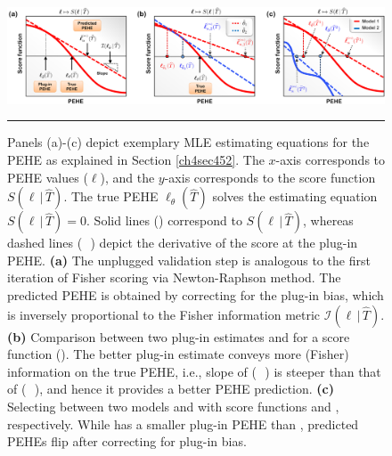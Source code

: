 \documentclass [PhD] {uclathes}
\newcommand*{\xdash}[1][1.5em]{\rule[0.25ex]{#1}{1.55pt}}
\newcommand*{\xdashed}[1][.25em]{\rule[0.25ex]{#1}{1.55pt}}
\newcommand*{\rxdashed}{{\color{red}{\xdashed}\,\color{red}{\xdashed}\,\color{red}{\xdashed}\,\color{red}{\xdashed}\,\color{red}{\xdashed}}}
\newcommand*{\rxdash}{{\color{red}{\xdash}}}
\newcommand*{\bxdashed}{{\color{blue}{\xdashed}\,\color{blue}{\xdashed}\,\color{blue}{\xdashed}\,\color{blue}{\xdashed}\,\color{blue}{\xdashed}}}
\begin{document}
\begin{figure}[t]
  \centering
  \includegraphics[width=1\linewidth]{ch4Fig3.pdf} 
  \caption{Panels (a)-(c) depict exemplary MLE estimating equations for the PEHE as explained in Section \ref{ch4sec452}. The \mbox{\footnotesize $x$}-axis corresponds to PEHE values (\mbox{\footnotesize $\boldsymbol{\ell}$}), and the \mbox{\footnotesize $y$}-axis corresponds to the score function \mbox{\footnotesize $S(\boldsymbol{\ell}\,|\,\widehat{T})$}. The true PEHE \mbox{\footnotesize $\boldsymbol{\ell}_{\theta}(\widehat{T})$} solves the estimating equation \mbox{\footnotesize $S(\boldsymbol{\ell}\,|\,\widehat{T})=0$}. Solid lines (\rxdash) correspond to \mbox{\footnotesize $S(\boldsymbol{\ell}\,|\,\widehat{T})$}, whereas dashed lines (\rxdashed) depict the derivative of the score at the plug-in PEHE. {\bf (a)} The unplugged validation step is analogous to the first iteration of Fisher scoring via Newton-Raphson method. The predicted PEHE is obtained by correcting for the plug-in bias, which is inversely proportional to the Fisher information metric \mbox{\footnotesize $\mathcal{I}(\boldsymbol{\ell}\,|\,\widehat{T})$}. {\bf (b)} Comparison between two plug-in estimates \mbox{\footnotesize {}} and \mbox{\footnotesize {}} for a score function \mbox{\footnotesize {}} (\rxdash). The better plug-in estimate conveys more (Fisher) information on the true PEHE, i.e., slope of (\bxdashed) is steeper than that of (\rxdashed), and hence it provides a better PEHE prediction. {\bf (c)} Selecting between two models \mbox{\footnotesize {}} and \mbox{\footnotesize {}} with score functions \mbox{\footnotesize {}} and \mbox{\footnotesize {}}, respectively. While \mbox{\footnotesize {}} has a smaller plug-in PEHE than \mbox{\footnotesize {}}, predicted PEHEs flip after correcting for plug-in bias.}	
\label{ch4fig3}
\rule{\textwidth}{.75pt}
\end{figure}
\end{document}
